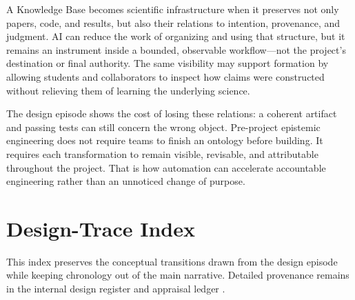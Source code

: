 \documentclass[10pt,a4paper]{article}
\begin{document}
A Knowledge Base becomes scientific infrastructure when it preserves not only papers, code, and results, but also their relations to intention, provenance, and judgment. AI can reduce the work of organizing and using that structure, but it remains an instrument inside a bounded, observable workflow---not the project's destination or final authority. The same visibility may support formation by allowing students and collaborators to inspect how claims were constructed without relieving them of learning the underlying science.

The design episode shows the cost of losing these relations: a coherent artifact and passing tests can still concern the wrong object. Pre-project epistemic engineering does not require teams to finish an ontology before building. It requires each transformation to remain visible, revisable, and attributable throughout the project. That is how automation can accelerate accountable engineering rather than an unnoticed change of purpose.

\appendix
\section{Design-Trace Index}

This index preserves the conceptual transitions drawn from the design episode while keeping chronology out of the main narrative. Detailed provenance remains in the internal design register and appraisal ledger \cite{caseevidence,stakeholderledger,sessionrecord}.
\end{document}

